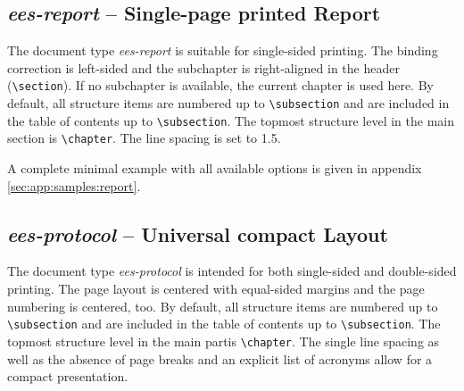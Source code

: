 \subsection{\textit{ees-report} -- Single-page printed Report}
\label{sec:documentTypes:report}
The document type \textit{ees-report} is suitable for single-sided printing. The binding correction is left-sided and the subchapter is right-aligned in the header (\lstinline|\section|). If no subchapter is available, the current chapter is used here. By default, all structure items are numbered up to \lstinline|\subsection| and are included in the table of contents up to \lstinline|\subsection|. The topmost structure level in the main section is \lstinline|\chapter|. The line spacing is set to \num{1.5}.

A complete minimal example with all available options is given in appendix \ref{sec:app:samples:report}.




\subsection{\textit{ees-protocol} -- Universal compact Layout}
\label{sec:documentTypes:protocol}
The document type \textit{ees-protocol} is intended for both single-sided and double-sided printing. The page layout is centered with equal-sided margins and the page numbering is centered, too. By default, all structure items are numbered up to \lstinline|\subsection| and are included in the table of contents up to \lstinline|\subsection|. The topmost structure level in the main partis \lstinline|\chapter|. The single line spacing as well as the absence of page breaks and an explicit list of acronyms allow for a compact presentation.

